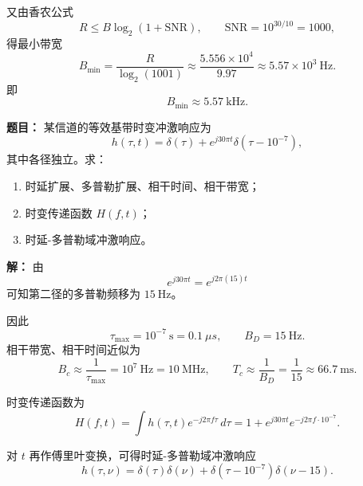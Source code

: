 又由香农公式
\[
R\le B\log_2(1+\mathrm{SNR}),
\qquad
\mathrm{SNR}=10^{30/10}=1000,
\]
得最小带宽
\[
B_{\min}=\frac{R}{\log_2(1001)}\approx \frac{5.556\times 10^4}{9.97}\approx 5.57\times 10^3\ \text{Hz}.
\]
即
\[
B_{\min}\approx 5.57\ \text{kHz}.
\]

\medskip
{}
\textbf{题目：}
某信道的等效基带时变冲激响应为
\[
h(\tau,t)=\delta(\tau)+e^{j30\pi t}\delta(\tau-10^{-7}),
\]
其中各径独立。求：
\begin{enumerate}
\item 时延扩展、多普勒扩展、相干时间、相干带宽；
\item 时变传递函数 $H(f,t)$；
\item 时延-多普勒域冲激响应。
\end{enumerate}

\par\textbf{解：}
由
\[
e^{j30\pi t}=e^{j2\pi(15)t}
\]
可知第二径的多普勒频移为 $15\ \text{Hz}$。

因此
\[
\tau_{\max}=10^{-7}\ \text{s}=0.1\ \mu s,
\qquad
B_D=15\ \text{Hz}.
\]
相干带宽、相干时间近似为
\[
B_c\approx \frac{1}{\tau_{\max}}=10^7\ \text{Hz}=10\ \text{MHz},
\qquad
T_c\approx \frac{1}{B_D}=\frac{1}{15}\approx 66.7\ \text{ms}.
\]

时变传递函数为
\[
H(f,t)=\int h(\tau,t)e^{-j2\pi f\tau}\,d\tau
=1+e^{j30\pi t}e^{-j2\pi f\cdot 10^{-7}}.
\]

对 $t$ 再作傅里叶变换，可得时延-多普勒域冲激响应
\[
h(\tau,\nu)=\delta(\tau)\delta(\nu)+\delta(\tau-10^{-7})\delta(\nu-15).
\]

\medskip
